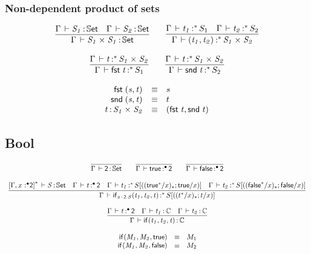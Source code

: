 \documentclass[11pt]{article}
\theoremstyle{plain}
\begin{document}
\subsubsection{Non-dependent product of sets}


\[
\begin{array}{c}
\infer{\ofdtp{\Gamma}{\prd{S_1}{S_1}}{\types}}
      {\ofdtp{\Gamma}{S_1}{\types} &
        \ofdtp{\Gamma}{S_2}{\types}}
\qquad
\infer{\oftpe{\Gamma}{\pair{t_1}{t_2}}{\vcond}{\prd {S_1} {S_2}}}
      { \oftpe{\Gamma}{t_1}{\vcond}{S_1} &
        \oftpe{\Gamma}{t_2}{\vcond}{S_2}}
\\ \\
\infer{\oftpe{\Gamma}{\fst t}{\vcond}{{S_1}}}
      {\oftpe{\Gamma}{t}{\vcond}{\prd{S_1}{S_2}}}
\qquad
\infer{\oftpe{\Gamma}{\snd t}{\vcond}{{S_2}}}
      {\oftpe{\Gamma}{t}{\vcond}{\prd{S_1}{S_2}}}
\end{array}
\]

\[
\begin{array}{rcll}
\mathit{\mathsf{fst}_{} \: \mathit{(s,t)_{}}} & \equiv & s \\
\mathit{\mathsf{snd}_{} \: \mathit{(s,t)_{}}} & \equiv & t \\
t \, \mathit{:} \, \mathit{S_1} \times_{\mathit{}} \mathit{S_2} & \equiv & \mathit{(\mathit{\mathsf{fst}_{} \: t},\mathit{\mathsf{snd}_{} \: t})_{}}
\end{array}
\]

\subsection{Bool}

\[
\begin{array}{c}
\infer{\ofdtp{\Gamma}{\bool}{\types}}
      {}
\qquad
\infer{\oftpe{\Gamma}{\dsd{true}}{\bullet}{\bool}}{}
\qquad
\infer{\oftpe{\Gamma}{\dsd{false}}{\bullet}{\bool}}{}
\\ \\
\infer{\oftpe{\Gamma}{\ite{\tptm{x}{\dsd{2}}.S}{t_1}{t_2}{t}}{\vcond}{\tsubst{S}{\substdup{(t^\vcond/x)}{\vcond}{t/x}}}}
      {\ofdtp{\dupctx{\Gamma,\tpvar{x}{\bullet}{\dsd{2}}}{\vcond}}{S}{\types} &
        \oftpe{\Gamma}{t}{\bullet}{\dsd{2}} &
        \oftpe{\Gamma}{t_1}{\vcond}{\tsubst{S}{\substdup{(\dsd{true}^\vcond/x)}{\vcond}{\dsd{true}/x}}} &
        \oftpe{\Gamma}{t_2}{\vcond}{\tsubst{S}{\substdup{(\dsd{false}^\vcond/x)}{\vcond}{\dsd{false}/x}}}
      }
\\ \\
\infer{\oftp{\Gamma}{\ite{}{t_1}{t_2}{t}}{\C}}
      { \oftpe{\Gamma}{t}{\bullet}{\dsd{2}} &
        \ofdtp{\Gamma}{t_1}{\C} &
        \ofdtp{\Gamma}{t_2}{\C}
      }
\\ \\
\begin{array}{rcll}
\ite{}{M_1}{M_2}{\dsd{true}} & \equiv & M_1 \\
\ite{}{M_1}{M_2}{\dsd{false}} & \equiv & M_2 \\
\end{array} \\
\end{array}
\]
\end{document}
